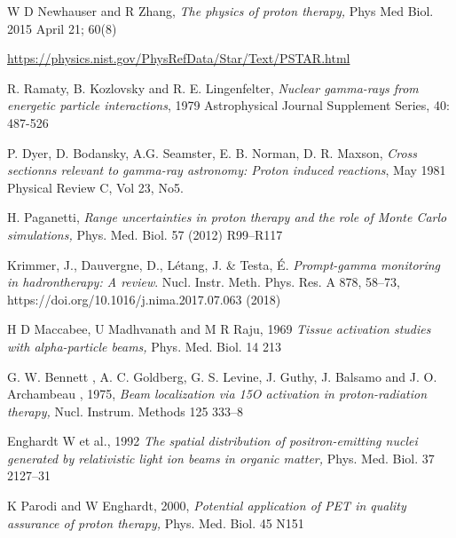 \documentclass[11pt,a4paper]{article}
\begin{document}
%
%
%
\begin{thebibliography}{9}

W D Newhauser and R Zhang, \emph{The physics of proton therapy,} Phys Med Biol. 2015 April 21; 60(8)

\url{https://physics.nist.gov/PhysRefData/Star/Text/PSTAR.html}

R. Ramaty, B. Kozlovsky and R. E. Lingenfelter, \emph{Nuclear gamma-rays from energetic particle interactions}, 1979 Astrophysical Journal Supplement Series, 40: 487-526

P. Dyer, D. Bodansky, A.G. Seamster, E. B. Norman, D. R. Maxson, \emph{Cross sectionns relevant to gamma-ray astronomy: Proton induced reactions}, May 1981 Physical Review C, Vol 23, No5.

H. Paganetti, \emph{Range uncertainties in proton therapy and the role of Monte Carlo simulations,} Phys. Med. Biol. 57 (2012) R99–R117

Krimmer, J., Dauvergne, D., Létang, J. \& Testa, É. \emph{Prompt-gamma monitoring in hadrontherapy: A review}. Nucl. Instr. Meth. Phys. Res. A 878, 58–73, https://doi.org/10.1016/j.nima.2017.07.063 (2018)

H D Maccabee, U Madhvanath and M R Raju, 1969 \emph{Tissue activation studies with alpha-particle beams,} Phys. Med. Biol. 14 213

G. W. Bennett , A. C. Goldberg, G. S. Levine, J. Guthy, J. Balsamo and  J. O. Archambeau , 1975, \emph{Beam localization via 15O activation in proton-radiation therapy,} Nucl. Instrum. Methods 125 333–8

Enghardt W et al., 1992 \emph{The spatial distribution of positron-emitting nuclei generated by relativistic light ion beams in organic matter,} Phys. Med. Biol. 37 2127–31

K Parodi and W Enghardt, 2000, \emph{Potential application of PET in quality assurance of proton therapy,} Phys. Med. Biol. 45 N151


\end{thebibliography}
\end{document}
